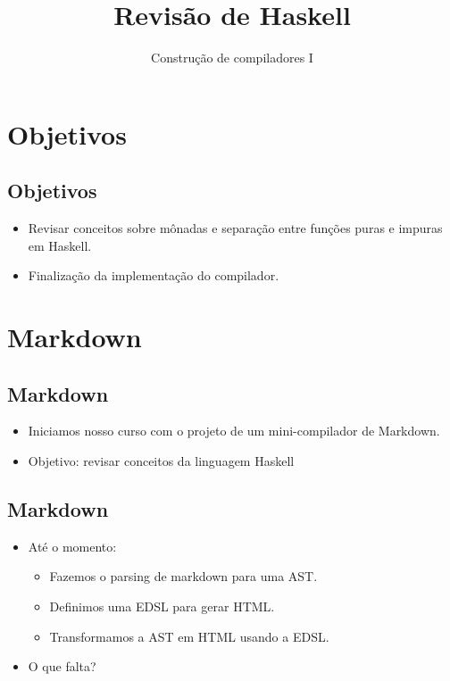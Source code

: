 \documentclass[11pt]{article}
\author{Construção de compiladores I}
\date{}
\title{Revisão de Haskell}
\begin{document}
\maketitle
\section*{Objetivos}
\label{sec:orgbbdbe53}

\subsection*{Objetivos}
\label{sec:org6f1efe3}

\begin{itemize}
\item Revisar conceitos sobre mônadas e separação entre funções puras e
impuras em Haskell.

\item Finalização da implementação do compilador.
\end{itemize}
\section*{Markdown}
\label{sec:org3d9c5b5}

\subsection*{Markdown}
\label{sec:org9aefd59}

\begin{itemize}
\item Iniciamos nosso curso com o projeto de um mini-compilador de Markdown.

\item Objetivo: revisar conceitos da linguagem Haskell
\end{itemize}
\subsection*{Markdown}
\label{sec:orgcdab37e}

\begin{itemize}
\item Até o momento:
\begin{itemize}
\item Fazemos o parsing de markdown para uma AST.
\item Definimos uma EDSL para gerar HTML.
\item Transformamos a AST em HTML usando a EDSL.
\end{itemize}

\item O que falta?
\end{itemize}
\end{document}
